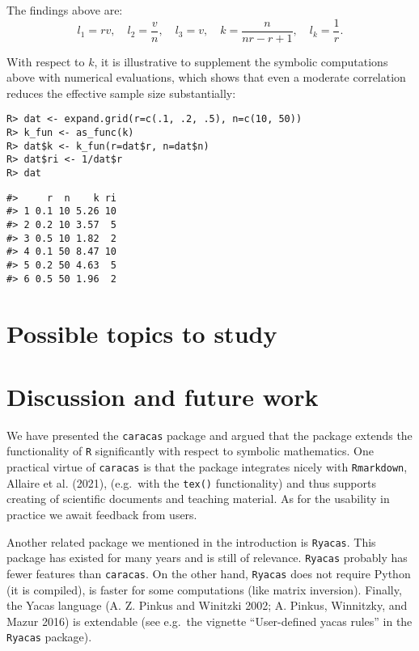 The findings above are:
\[
l_1 = r v, \quad
l_2 = \frac{v}{n}, \quad
l_3 = v, \quad
k = \frac{n}{n r - r + 1}, \quad 
l_k = \frac{1}{r} .
\]

With respect to \(k\), it is illustrative to supplement the symbolic
computations above with numerical evaluations, which shows that
even a moderate correlation reduces the effective sample size substantially:

\begin{verbatim}
R> dat <- expand.grid(r=c(.1, .2, .5), n=c(10, 50))
R> k_fun <- as_func(k)
R> dat$k <- k_fun(r=dat$r, n=dat$n)
R> dat$ri <- 1/dat$r
R> dat
\end{verbatim}

\begin{verbatim}
#>     r  n    k ri
#> 1 0.1 10 5.26 10
#> 2 0.2 10 3.57  5
#> 3 0.5 10 1.82  2
#> 4 0.1 50 8.47 10
#> 5 0.2 50 4.63  5
#> 6 0.5 50 1.96  2
\end{verbatim}

\hypertarget{possible-topics-to-study}{%
\section{Possible topics to study}\label{possible-topics-to-study}}

\hypertarget{discussion-and-future-work}{%
\section{Discussion and future work}\label{discussion-and-future-work}}

We have presented the \texttt{caracas} package and argued that the
package extends the functionality of \texttt{R} significantly with respect to
symbolic mathematics. One practical virtue of \texttt{caracas} is
that the package integrates nicely with \texttt{Rmarkdown},
Allaire et al. (2021), (e.g.~with the \texttt{tex()} functionality) and thus
supports creating of scientific documents and teaching material. As
for the usability in practice we await feedback from users.

Another related package we mentioned in the introduction is \texttt{Ryacas}.
This package has existed for many years and is still of relevance.
\texttt{Ryacas} probably has fewer features than \texttt{caracas}. On the other
hand, \texttt{Ryacas} does not require Python (it is compiled), is faster for
some computations (like matrix inversion). Finally, the Yacas language
(A. Z. Pinkus and Winitzki 2002; A. Pinkus, Winnitzky, and Mazur 2016) is extendable (see e.g.~the vignette
``User-defined yacas rules'' in the \texttt{Ryacas} package).

